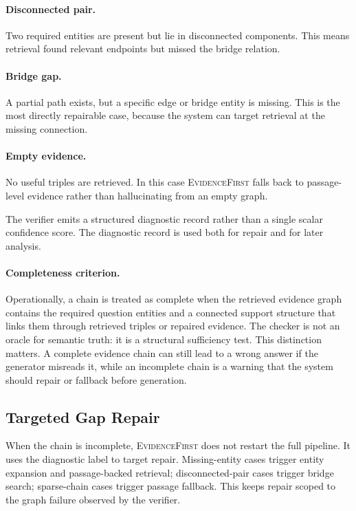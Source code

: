 \documentclass[runningheads]{llncs}
\newcommand{\sys}{\textsc{EvidenceFirst}\xspace}
\begin{document}
\paragraph{Disconnected pair.}
Two required entities are present but lie in disconnected components. This
means retrieval found relevant endpoints but missed the bridge relation.

\paragraph{Bridge gap.}
A partial path exists, but a specific edge or bridge entity is missing. This is
the most directly repairable case, because the system can target retrieval at
the missing connection.

\paragraph{Empty evidence.}
No useful triples are retrieved. In this case \sys falls back to passage-level
evidence rather than hallucinating from an empty graph.

The verifier emits a structured diagnostic record rather than a single scalar
confidence score. The diagnostic record is used both for repair and for later
analysis.

\paragraph{Completeness criterion.}
Operationally, a chain is treated as complete when the retrieved evidence graph
contains the required question entities and a connected support structure that
links them through retrieved triples or repaired evidence. The checker is not
an oracle for semantic truth: it is a structural sufficiency test. This
distinction matters. A complete evidence chain can still lead to a wrong answer
if the generator misreads it, while an incomplete chain is a warning that the
system should repair or fallback before generation.

\subsection{Targeted Gap Repair}
\label{sec:repair}

When the chain is incomplete, \sys does not restart the full pipeline. It uses
the diagnostic label to target repair. Missing-entity cases trigger entity
expansion and passage-backed retrieval; disconnected-pair cases trigger bridge
search; sparse-chain cases trigger passage fallback. This keeps repair scoped
to the graph failure observed by the verifier.
\end{document}
